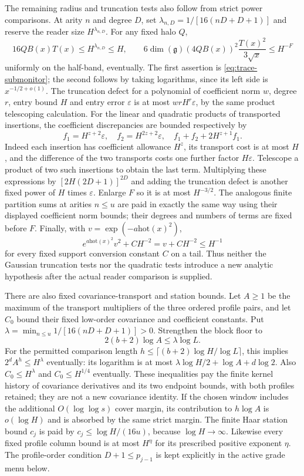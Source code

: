 The remaining radius and truncation tests also follow from strict
power comparisons. At arity $n$ and degree $D$, set
$\lambda_{n,D}=1/[16(nD+D+1)]$ and reserve the reader size
$H^{\lambda_{n,D}}$. For any fixed halo $Q$,
\[
 16QB(x)T(x)\le H^{\lambda_{n,D}}\le H,
 \qquad
 6\dim(\mathfrak g)(4QB(x))^2
       \frac{T(x)^2}{3\sqrt{x}}\le H^{-F}
\]
uniformly on the half-band, eventually. The first assertion is
\eqref{eq:trace-submonitor}; the second follows by taking logarithms,
since its left side is $x^{-1/2+o(1)}$. The truncation defect for a
polynomial of coefficient norm $w$, degree $r$, entry bound $H$ and
entry error $\varepsilon$ is at most $wrH^r\varepsilon$, by the
same product telescoping calculation. For the linear and quadratic
products of transported insertions, the coefficient discrepancies
are bounded respectively by
\[
 f_1=H^{z+2}\varepsilon,\quad
 f_2=H^{2z+2}\varepsilon,\quad
 f_1+f_2+2H^{z+1}f_1.
\]
Indeed each insertion has coefficient allowance $H^z$, its transport
cost is at most $H$, and the difference of the two transports costs
one further factor $H\varepsilon$. Telescope a product of two such
insertions to obtain the last term. Multiplying these expressions by
$[2H(2D+1)]^{2D}$ and adding the truncation defect is another fixed
power of $H$ times $\varepsilon$. Enlarge $F$ so it is at most
$H^{-3/2}$. The analogous finite partition sums at arities $n\le u$
are paid in exactly the same way using their displayed coefficient
norm bounds; their degrees and numbers of terms are fixed before $F$.
Finally, with $v=\exp(-a\mathrm{hot}(x)^2)$,
\[
 e^{a\mathrm{hot}(x)^2}v^2+C H^{-2}
       =v+CH^{-2}\le H^{-1}
\]
for every fixed support conversion constant $C$ on a tail. Thus neither
the Gaussian truncation tests nor the quadratic tests introduce a new
analytic hypothesis after the actual reader comparison is supplied.

There are also fixed covariance-transport and station bounds. Let
$A\ge1$ be the maximum of the transport multipliers of the three
ordered profile pairs, and let $C_0$ bound their fixed low-order
covariance and coefficient constants. Put
$\lambda=\min_{n\le u}1/[16(nD+D+1)]>0$.
Strengthen the block floor to
\[
 2(b+2)\log A\le\lambda\log L.
\]
For the permitted comparison length
$h\le\lceil(b+2)\log H/\log L\rceil$, this implies
$2^dA^h\le H^\lambda$ eventually: its logarithm is at most
$\lambda\log H/2+\log A+d\log2$.
Also $C_0\le H^\lambda$ and $C_0\le H^{1/4}$ eventually.
These inequalities pay the finite kernel history of covariance derivatives
and its two endpoint bounds, with both profiles retained; they are
not a new covariance identity. If the chosen window includes the
additional $O(\log\log s)$ cover margin, its contribution to
$h\log A$ is $o(\log H)$ and is absorbed by the same strict margin.
The finite Haar station bound $c_j$ is paid by
$c_j\le\log H/(16u)$, because $\log H\to\infty$.
Likewise every fixed profile column bound is at most $H^\eta$ for
its prescribed positive exponent $\eta$. The profile-order condition
$D+1\le p_{j-1}$ is kept explicitly in the active grade menu below.

